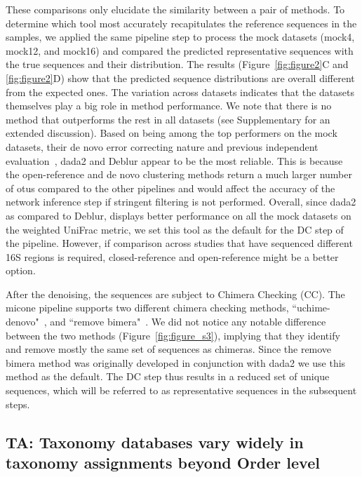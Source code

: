 \documentclass[letterpaper,12pt]{article}
\begin{document}
  These comparisons only elucidate the similarity between a pair of methods.
  To determine which tool most accurately recapitulates the reference sequences in the samples, we applied the same pipeline step to process the mock datasets (mock4, mock12, and mock16) and compared the predicted representative sequences with the true sequences and their distribution.
  The results (Figure~\ref{fig:figure2}C and \ref{fig:figure2}D) show that the predicted sequence distributions are overall different from the expected ones.
  The variation across datasets indicates that the datasets themselves play a big role in method performance.
  We note that there is no method that outperforms the rest in all datasets (see Supplementary for an extended discussion).
  Based on being among the top performers on the mock datasets, their de novo error correcting nature and previous independent evaluation~\cite{Nearing2018}, \ac{dada2} and Deblur appear to be the most reliable.
  This is because the open-reference and de novo clustering methods return a much larger number of \ac{otu}s compared to the other pipelines and would affect the accuracy of the network inference step if stringent filtering is not performed.
  Overall, since \ac{dada2} as compared to Deblur, displays better performance on all the mock datasets on the weighted UniFrac metric, we set this tool as the default for the DC step of the pipeline.
  However, if comparison across studies that have sequenced different 16S regions is required, closed-reference and open-reference might be a better option.

  After the denoising, the sequences are subject to Chimera Checking (CC).
  The \ac{micone} pipeline supports two different chimera checking methods, ``uchime-denovo"~\cite{bolyenReproducibleInteractiveScalable2019}, and ``remove bimera"~\cite{Callahan2016}.
  We did not notice any notable difference between the two methods (Figure~\ref{fig:figure_s3}), implying that they identify and remove mostly the same set of sequences as chimeras.
  Since the remove bimera method was originally developed in conjunction with dada2 we use this method as the default.
  The DC step thus results in a reduced set of unique sequences, which will be referred to as representative sequences in the subsequent steps.

  \FloatBarrier

  \subsection*{TA: Taxonomy databases vary widely in taxonomy assignments beyond Order level}
\end{document}

